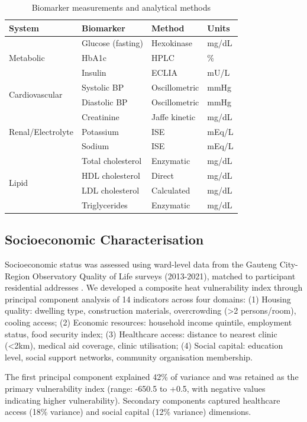 \documentclass[11pt,a4paper]{article}
\begin{document}
\begin{table}[h!]
\centering
\caption{Biomarker measurements and analytical methods}
\begin{tabular}{llll}
\toprule
\textbf{System} & \textbf{Biomarker} & \textbf{Method} & \textbf{Units} \\
\midrule
\multirow{3}{*}{Metabolic} & Glucose (fasting) & Hexokinase & mg/dL \\
 & HbA1c & HPLC & \% \\
 & Insulin & ECLIA & mU/L \\
\midrule
\multirow{2}{*}{Cardiovascular} & Systolic BP & Oscillometric & mmHg \\
 & Diastolic BP & Oscillometric & mmHg \\
\midrule
\multirow{3}{*}{Renal/Electrolyte} & Creatinine & Jaffe kinetic & mg/dL \\
 & Potassium & ISE & mEq/L \\
 & Sodium & ISE & mEq/L \\
\midrule
\multirow{4}{*}{Lipid} & Total cholesterol & Enzymatic & mg/dL \\
 & HDL cholesterol & Direct & mg/dL \\
 & LDL cholesterol & Calculated & mg/dL \\
 & Triglycerides & Enzymatic & mg/dL \\
\bottomrule
\end{tabular}
\end{table}

\subsection{Socioeconomic Characterisation}

Socioeconomic status was assessed using ward-level data from the Gauteng City-Region Observatory Quality of Life surveys (2013-2021), matched to participant residential addresses \citep{DeKadt2021}. We developed a composite heat vulnerability index through principal component analysis of 14 indicators across four domains: (1) Housing quality: dwelling type, construction materials, overcrowding (>2 persons/room), cooling access; (2) Economic resources: household income quintile, employment status, food security index; (3) Healthcare access: distance to nearest clinic (<2km), medical aid coverage, clinic utilisation; (4) Social capital: education level, social support networks, community organisation membership.

The first principal component explained 42\% of variance and was retained as the primary vulnerability index (range: -650.5 to +0.5, with negative values indicating higher vulnerability). Secondary components captured healthcare access (18\% variance) and social capital (12\% variance) dimensions.
\end{document}
